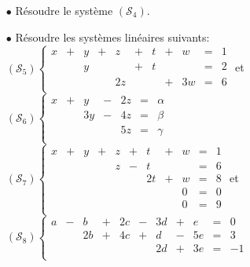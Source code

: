 \documentclass[a4paper, 11pt]{article}
\begin{document}
\vspace{0.3cm}

\setlength\fboxrule{1pt}
\setlength\fboxrule{0.5pt}

\begin{exemples} 
\begin{itemize}
\item[$\bullet$] R\'esoudre le syst\`{e}me $(\mathcal{S}_4)$.
\item[$\bullet$]R\'esoudre les syst\`{e}mes lin\'eaires suivants:\\
$(\mathcal{S}_5)
\left\lbrace\begin{array}{rcrcrcrcrcr}
x&+&y&+&z&+&t&+&w&=&1\\
&&y&&&+&t&&&=&2\\
&&&&2z&&&+&3w&=&6\\
\end{array}\right.$ \quad et \quad  
$(\mathcal{S}_6)
\left\lbrace\begin{array}{rcrcrcr}
x&+&y&-&2z&=&\alpha\\
&&3y&-&4z&=&\beta\\
&&&&5z&=&\gamma\\
\end{array}\right.$ \\
\vspace*{0.5cm}
$(\mathcal{S}_7)
\left\lbrace\begin{array}{rcrcrcrcrcr}
x&+&y&+&z&+&t&+&w&=&1\\
&&&&z&-&t&&&=&6\\
&&&&&&2t&+&w&=&8\\
&&&&&&&&0&=&0\\
&&&&&&&&0&=&9\\
\end{array}\right.$ \quad et \quad  
$(\mathcal{S}_8)
\left\lbrace\begin{array}{rcrcrcrcrcr}
a &- &b&+&2c&-&3d&+&e&=&0\\
 & &2b&+&4c&+&d&-&5e&=&3\\
 & &&&&&2d&+&3e&=&-1\\
\end{array}\right.$
\end{itemize}
\end{exemples}
\end{document}
